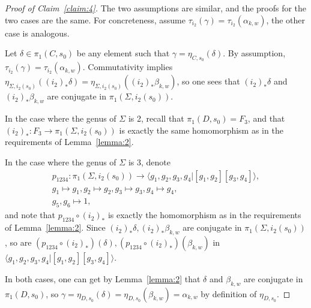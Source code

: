 \documentclass[11pt]{article}
\newenvironment{myequation}
    {
        \begin{equation*}
        \begin{gathered}
    }
    { 
        \end{gathered} 
        \end{equation*}
    }
\begin{document}
            \begin{proof}[Proof of Claim~\ref{claim:4}]
                The two assumptions are similar, and the proofs for the two cases are the same. For concreteness, assume $\tau_{i_2}(\gamma) = \tau_{i_2}(\alpha_{k,w})$, the other case is analogous.
                
                Let $\delta \in \pi_1(C,s_0)$ be any element such that $\gamma = \eta_{C,s_0}(\delta)$. By assumption, $\tau_{i_2}(\gamma) = \tau_{i_2}(\alpha_{k,w})$. Commutativity implies $\eta_{\Sigma,i_2(s_0)}((i_2)_* \delta) = \eta_{\Sigma,i_2(s_0)}((i_2)_* \beta_{k,w})$, so one sees that $(i_2)_* \delta$ and $(i_2)_* \beta_{k,w}$ are conjugate in $\pi_1(\Sigma, i_2(s_0))$. 
                
                In the case where the genus of $\Sigma$ is 2, recall that $\pi_1(D,s_0) = F_3$, and that $(i_2)_* : F_3 \to \pi_1(\Sigma, i_2(s_0))$ is exactly the same homomorphism as in the requirements of Lemma~\ref{lemma:2}.
                
                In the case where the genus of $\Sigma$ is 3, denote
                \begin{myequation}
                    p_{1234}: \pi_1(\Sigma, i_2(s_0)) \to \langle g_1,g_2,g_3,g_4 | [g_1,g_2][g_3,g_4] \rangle , \\
                    g_1 \mapsto g_1, g_2 \mapsto g_2, g_3 \mapsto g_3, g_4 \mapsto g_4 , \\
                    g_5,g_6 \mapsto 1 , 
                \end{myequation}
                and note that $p_{1234} \circ (i_2)_*$ is exactly the homomorphism as in the requirements of Lemma~\ref{lemma:2}. Since $(i_2)_* \delta, (i_2)_* \beta_{k,w}$ are conjugate in $\pi_1(\Sigma, i_2(s_0))$, so are $(p_{1234} \circ (i_2)_*) (\delta), (p_{1234} \circ (i_2)_*) (\beta_{k,w})$ in $\langle g_1,g_2,g_3,g_4 | [g_1,g_2][g_3,g_4] \rangle$.
                
                In both cases, one can get by Lemma~\ref{lemma:2} that $\delta$ and $\beta_{k,w}$ are conjugate in $\pi_1(D,s_0)$, so $\gamma = \eta_{D,s_0}(\delta) = \eta_{D,s_0}(\beta_{k,w}) = \alpha_{k,w}$ by definition of $\eta_{D,s_0}$.
            \end{proof}
            
\end{document}

